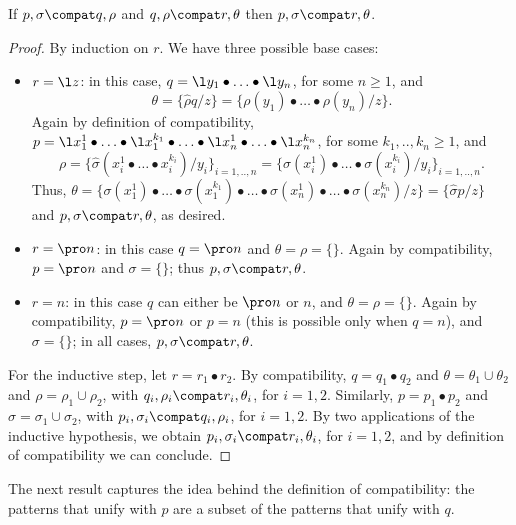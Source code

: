 \documentclass{LMCS}
\begin{document}
\begin{prop}
\label{prop:trans-pattern}
If $p,\sigma \compat q,\rho$ and $q,\rho \compat r,\theta$ then $p,\sigma \compat r,\theta$.
\end{prop}
\begin{proof}
By induction on $r$. We have three possible base cases:
\begin{itemize}
\item $r = \l z$: in this case, $q = \l y_1 \bullet \ldots \bullet \l y_n$, for some $n \geq 1$, and
	$$\theta = \{\hat\rho q/z\} = \{\rho(y_1) \bullet \ldots \bullet \rho(y_n) / z\}.$$ 
	Again by definition of compatibility,
	$p = \l x_1^1 \bullet \ldots \bullet \l x_1^{k_1} \bullet \ldots \bullet \l x_n^1 \bullet \ldots \bullet \l x_n^{k_n}$,
	for some $k_1,.., k_n \geq 1$, and 
	$$\rho = \{\hat\sigma (x_i^1 \bullet \ldots \bullet x_i^{k_i})/y_i\}_{i = 1,..,n} = 
	\{\sigma(x_i^1) \bullet \ldots \bullet \sigma(x_i^{k_i})/y_i\}_{i = 1,..,n}.$$
	Thus, $\theta = \{\sigma(x_1^1) \bullet \ldots \bullet \sigma(x_1^{k_1}) \bullet \ldots \bullet
	\sigma(x_n^1) \bullet \ldots \bullet \sigma(x_n^{k_n})/z\} = \{\hat\sigma p/z\}$
	and $p,\sigma \compat r,\theta$, as desired.
\item $r = \pro n$: in this case $q = \pro n$ and $\theta = \rho = \{\}$. Again by compatibility,
	$p = \pro n$ and $\sigma = \{\}$; thus $p,\sigma \compat r,\theta$.
\item $r = n$: in this case $q$ can either be $\pro n$ or $n$, and $\theta = \rho = \{\}$. Again by compatibility,
	$p = \pro n$ or $p = n$ (this is possible only when $q = n$), and $\sigma = \{\}$; in all cases, 
	$p,\sigma \compat r,\theta$.
\end{itemize}
For the inductive step, let $r = r_1 \bullet r_2$. By compatibility, $q = q_1 \bullet q_2$ and
$\theta = \theta_1 \cup \theta_2$ and $\rho = \rho_1 \cup \rho_2$, with
$q_i,\rho_i \compat r_i,\theta_i$, for $i = 1,2$. Similarly, $p = p_1 \bullet p_2$ and 
$\sigma = \sigma_1 \cup \sigma_2$, with $p_i,\sigma_i \compat q_i,\rho_i$, for $i = 1,2$. 
By two applications of the inductive hypothesis, we obtain $p_i,\sigma_i \compat r_i,\theta_i$, for $i = 1,2$,
and by definition of compatibility we can conclude.
\end{proof}

The next result captures the idea behind the definition of
compatibility: the patterns that unify with $p$ are a subset of the
patterns that unify with $q$.
\end{document}
